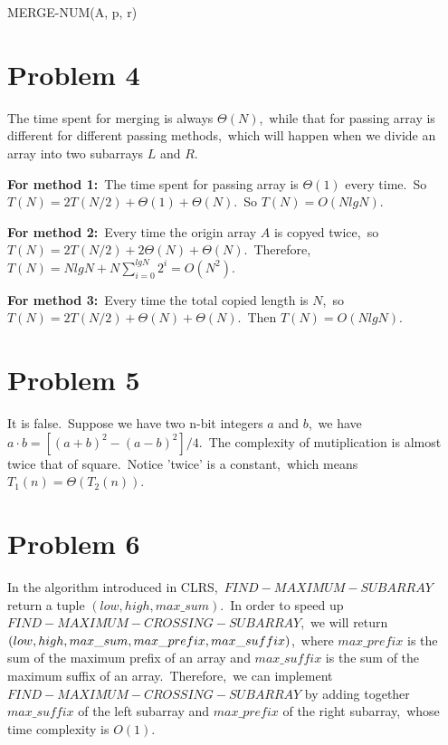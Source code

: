 \documentclass[]{article}
\begin{document}
	\begin{algorithm}[H]
		\caption{MERGE-NUM(A, p, r)} %
		\begin{algorithmic}[1]
		\Else
		\EndIf
		\end{algorithmic}
	\end{algorithm}
    
	\section{Problem 4}
	The time spent for merging is always $\Theta(N)$,\ while that for passing array is different for different passing methods,\ which will happen when we divide an array into two subarrays $L$ and $R$.
	
	\textbf{For method 1:}\ The time spent for passing array is $\Theta(1)$ every time.\ So $T(N) = 2T(N/2) + \Theta(1) + \Theta(N)$.\ So $T(N) = O(NlgN)$.
	
	\textbf{For method 2:}\ Every time the origin array $A$ is copyed twice,\ so $T(N) = 2T(N/2) + 2\Theta(N) + \Theta(N)$.\ Therefore,\ $T(N) = NlgN + N\sum_{i=0}^{lgN}2^i = O(N^2)$.
	
	\textbf{For method 3:}\ Every time the total copied length is $N$,\ so $T(N) = 2T(N/2) + \Theta(N) + \Theta(N)$.\ Then $T(N) = O(NlgN)$.
	
	\section{Problem 5}
	It is false.\ Suppose we have two n-bit integers $a$ and $b$,\ we have $a\cdot b = [(a + b)^2 - (a - b)^2] / 4$.\ The complexity of mutiplication is almost twice that of square.\ Notice 'twice' is a constant,\ which means $T_1(n) = \Theta(T_2(n))$. 
	
	\section{Problem 6}
	In the algorithm introduced in CLRS,\ $FIND-MAXIMUM-SUBARRAY$ return a tuple $(low, high, max\_sum)$.\ In order to speed up $FIND-MAXIMUM-CROSSING-SUBARRAY$,\ we will return $(low, high, max\_sum, max\_prefix,\\ max\_suffix)$,\ where $max\_prefix$ is the sum of the maximum prefix of an array and $max\_suffix$ is the sum of the maximum suffix of an array.\ Therefore,\ we can implement $FIND-MAXIMUM-CROSSING-SUBARRAY$ by adding together $max\_suffix$ of the left subarray and $max\_prefix$ of the right	subarray,\ whose time complexity is $O(1)$.
	
\end{document}
